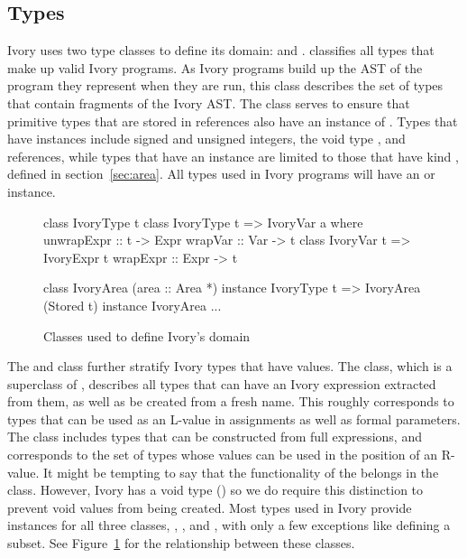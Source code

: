 \subsection{Types}
\label{sec:types}

Ivory uses two type classes to define its domain:  and
.   classifies all types that make up valid Ivory
programs.  As Ivory programs build up the AST of the program they represent when
they are run, this class describes the set of types that contain fragments of
the Ivory AST.  The  class serves to ensure that primitive types
that are stored in references also have an instance of .  Types
that have  instances include signed and unsigned integers, the
void type \cd{()}, and references, while types that have an 
instance are limited to those that have kind , defined in
section~\ref{sec:area}.  All types used in Ivory programs will have an
 or  instance.

\begin{figure}[ht]
\begin{code}
class IvoryType t
class IvoryType t => IvoryVar a where
  unwrapExpr :: t -> Expr
  wrapVar    :: Var -> t
class IvoryVar t => IvoryExpr t
  wrapExpr   :: Expr -> t

class    IvoryArea (area :: Area *)
instance IvoryType t => IvoryArea (Stored t)
instance IvoryArea ...
\end{code}
\caption{Classes used to define Ivory's domain}
\label{fig:types}
\end{figure}

The  and  class further stratify Ivory types that
have values.  The  class, which is a superclass of ,
describes all types that can have an Ivory expression extracted from them, as
well as be created from a fresh name.  This roughly corresponds to types that
can be used as an L-value in assignments as well as formal parameters.  The
 class includes types that can be constructed from full
expressions, and corresponds to the set of types whose values can be used in the
position of an R-value.  It might be tempting to say that the functionality of
the  belongs in the  class. However, Ivory has a void
type (\cd{()}) so we do require this distinction to prevent void values from
being created.  Most types used in Ivory provide instances for all three
classes, , , and , with only a few
exceptions like \cd{()} defining a subset.  See Figure~\ref{fig:types} for the
relationship between these classes.


